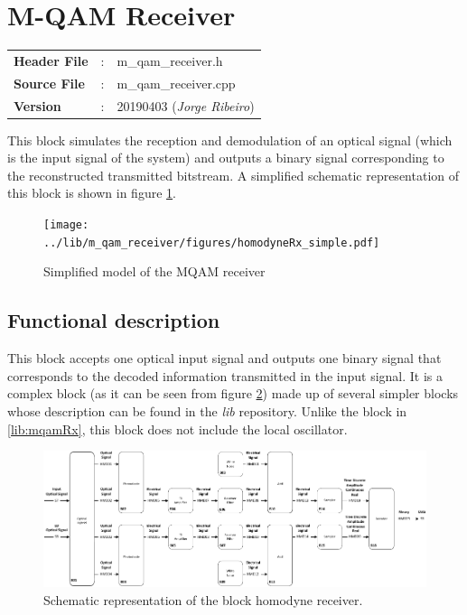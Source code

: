 \clearpage

\section{M-QAM Receiver}\label{lib:homodyneRx}

\begin{tcolorbox}	
	\begin{tabular}{p{2.75cm} p{0.2cm} p{10.5cm}} 	
		\textbf{Header File}   &:& m\_qam\_receiver.h \\
		\textbf{Source File}   &:& m\_qam\_receiver.cpp \\
        \textbf{Version}       &:& 20190403 (\emph{Jorge Ribeiro})\\
	\end{tabular}
\end{tcolorbox}

This block simulates the reception and demodulation of an optical
signal (which is the input signal of the system) and outputs a binary signal
corresponding to the reconstructed transmitted bitstream.
 A simplified schematic representation of this block is shown in
figure
\ref{fig:homodyneRx_simple}.

\begin{figure}[h]
	\centering
	\texttt{[image: ../lib/m\_qam\_receiver/figures/homodyneRx\_simple.pdf]}
	\caption{Simplified model of the MQAM
	receiver}\label{fig:homodyneRx_simple}
\end{figure}

\subsection*{Functional description}

This block accepts one optical input signal and outputs one binary signal that
corresponds to the decoded information transmitted in the input signal. It is a
complex
block (as it can be seen from figure \ref{fig:homodyneRx_blocks}) made up of
several simpler blocks whose description can be found in the
\textit{lib} repository. Unlike the block in \ref{lib:mqamRx}, this block does
not include the local oscillator.

\begin{figure}[h]
	\centering
	\includegraphics[width=\textwidth]{../lib/m_qam_receiver/figures/homodyneRx_blocks.pdf}
	\caption{Schematic representation of the block homodyne
	receiver.}\label{fig:homodyneRx_blocks}
\end{figure}

